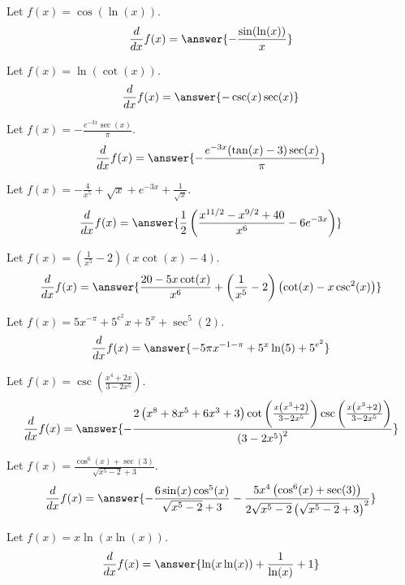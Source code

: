\documentclass{ximera}
\begin{document}
\begin{shuffle}
\begin{exercise}
Let $f(x)=\cos (\ln (x))$.
\[
\ddx f(x) = \answer{-\frac{\sin (\ln (x))}{x}}
\]
\end{exercise}

\begin{exercise}
Let $f(x)=\ln (\cot (x))$.
\[
\ddx f(x) = \answer{-\csc (x) \sec (x)}
\]
\end{exercise}

\begin{exercise}
Let $f(x)=-\frac{e^{-3 x} \sec (x)}{\pi }$.
\[
\ddx f(x) = \answer{-\frac{e^{-3 x} (\tan (x)-3) \sec (x)}{\pi }}
\]
\end{exercise}

\begin{exercise}
Let $f(x)=-\frac{4}{x^5}+\sqrt{x}+e^{-3 x}+\frac{1}{\sqrt{x}}$.
\[
\ddx f(x) = \answer{\frac{1}{2} \left(\frac{x^{11/2}-x^{9/2}+40}{x^6}-6 e^{-3 x}\right)}
\]
\end{exercise}

\begin{exercise}
Let $f(x)=\left(\frac{1}{x^5}-2\right) (x \cot (x)-4)$.
\[
\ddx f(x) = \answer{\frac{20-5 x \cot (x)}{x^6}+\left(\frac{1}{x^5}-2\right) \left(\cot (x)-x \csc ^2(x)\right)}
\]
\end{exercise}

\begin{exercise}
Let $f(x)=5 x^{-\pi }+5^{e^2} x+5^x+\sec ^5(2)$.
\[
\ddx f(x) = \answer{-5 \pi  x^{-1-\pi }+5^x \ln (5)+5^{e^2}}
\]
\end{exercise}

\begin{exercise}
Let $f(x)=\csc \left(\frac{x^4+2 x}{3-2 x^5}\right)$.
\[
\ddx f(x) = \answer{-\frac{2 \left(x^8+8 x^5+6 x^3+3\right) \cot \left(\frac{x \left(x^3+2\right)}{3-2 x^5}\right) \csc \left(\frac{x \left(x^3+2\right)}{3-2 x^5}\right)}{\left(3-2 x^5\right)^2}}
\]
\end{exercise}

\begin{exercise}
Let $f(x)=\frac{\cos ^6(x)+\sec (3)}{\sqrt{x^5-2}+3}$.
\[
\ddx f(x) = \answer{-\frac{6 \sin (x) \cos ^5(x)}{\sqrt{x^5-2}+3}-\frac{5 x^4 \left(\cos ^6(x)+\sec (3)\right)}{2 \sqrt{x^5-2} \left(\sqrt{x^5-2}+3\right)^2}}
\]
\end{exercise}

\begin{exercise}
Let $f(x)=x \ln (x \ln (x))$.
\[
\ddx f(x) = \answer{\ln (x \ln (x))+\frac{1}{\ln (x)}+1}
\]
\end{exercise}


\end{shuffle}
\end{document}
